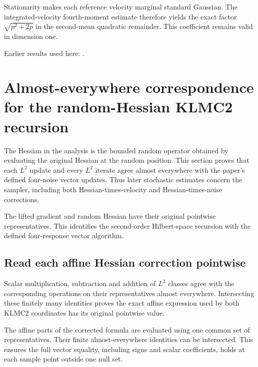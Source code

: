 \documentclass[11pt,a4paper]{report}
\begin{document}
Stationarity makes each reference velocity marginal standard Gaussian. The integrated-velocity fourth-moment estimate therefore yields the exact factor \(\sqrt{p^2+2p}\) in the second-mean quadratic remainder. This coefficient remains valid in dimension one.



Earlier results used here: \cite[Section~3.13.2]{LangevinLean2026ULASC}.
\section{\texorpdfstring{Almost-everywhere correspondence for the random-Hessian KLMC2 recursion}{Almost-everywhere correspondence for the random-Hessian KLMC2 recursion}}
\label{proof-module-KineticLangevin-LpKLMC2-lean}


The Hessian in the analysis is the bounded random operator obtained by evaluating the original Hessian at the random position. This section proves that each \(L^{2}\) update and every \(L^{2}\) iterate agree almost everywhere with the paper’s defined four-noise vector updates. Thus later stochastic estimates concern the sampler, including both Hessian-times-velocity and Hessian-times-noise corrections.



The lifted gradient and random Hessian have their original pointwise representatives. This identifies the second-order Hilbert-space recursion with the defined four-response vector algorithm.

\subsection{\texorpdfstring{Read each affine Hessian correction pointwise}{Read each affine Hessian correction pointwise}}
\label{report-step-KineticLangevin-LpKLMC2-lean-1}


Scalar multiplication, subtraction and addition of \(L^{2}\) classes agree with the corresponding operations on their representatives almost everywhere. Intersecting these finitely many identities proves the exact affine expression used by both KLMC2 coordinates has its original pointwise value.



The affine parts of the corrected formula are evaluated using one common set of representatives. Their finite almost-everywhere identities can be intersected. This ensures the full vector equality, including signs and scalar coefficients, holds at each sample point outside one null set.
\end{document}
